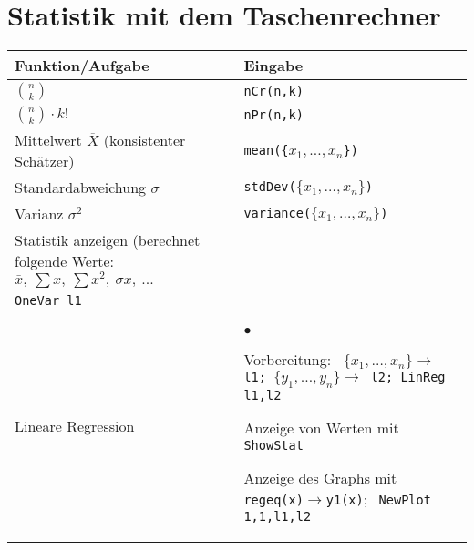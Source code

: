 \section{Statistik mit dem Taschenrechner}

\begin{center}
\begin{tabular}{|p{4cm}|p{11cm}|} \hline
\textbf{Funktion/Aufgabe} & \textbf{Eingabe} \\ \hline
$\binom{n}{k}$ & \tt{nCr(n,k)} \\ \hline
$\binom{n}{k}\cdot k!$ & \tt{nPr(n,k)} \\ \hline
Mittelwert $\overline{X}$ (konsistenter Schätzer) &
\tt{mean(\{}$x_1,\ldots,x_n$\tt{\})} \\ \hline
Standardabweichung $\sigma$ & \tt{stdDev($\{x_1, \ldots, x_n\}$)} \\ \hline
Varianz $\sigma^2$ & \tt{variance($\{x_1, \ldots, x_n\}$)} \\ \hline
Statistik anzeigen (berechnet folgende Werte: $ \bar x, \: \sum x, \: \sum x^2, \: \sigma x, \: ...$ &
\begin{minipage}[c]{11cm}\texttt{$\{x_1, \ldots, x_n\} \rightarrow$ l1} \\
					  \texttt{OneVar l1} \end{minipage} \\ \hline

Lineare Regression &     
\begin{list}{$\bullet$}{\setlength{\itemsep}{0cm}
	\setlength{\parsep}{0cm} \setlength{\topsep}{0cm}}  
	\item Vorbereitung:\newline
		\texttt{
			$\{x_1, \ldots, x_n\} \rightarrow$ l1;
			$\{y_1, \ldots, y_n\} \rightarrow$ l2;
			LinReg l1,l2}
	 \item Anzeige von Werten mit \newline \texttt{ShowStat}
	 \item Anzeige des Graphs mit \newline
	 	\texttt{regeq(x)}$\rightarrow$\texttt{y1(x)}$; \;$
	    \texttt{NewPlot 1,1,l1,l2}
\end{list} \\ \hline


\end{tabular}
\end{center}